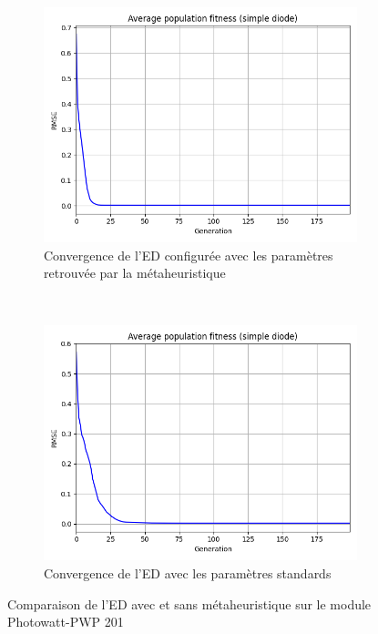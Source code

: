 \begin{figure}[!h]
    \centering
    \begin{subfigure}[b]{0.49\textwidth}
        \includegraphics[width=\textwidth]{resources/pwp/metafit.png}
        \caption{Convergence de l'ED configurée avec les paramètres retrouvée par la métaheuristique}
    \end{subfigure}
    ~
    \begin{subfigure}[b]{0.49\textwidth}
        \includegraphics[width=\textwidth]{resources/pwp/fitness.png}
        \caption{Convergence de l'ED avec les paramètres standards}
    \end{subfigure}
    \caption{Comparaison de l'ED avec et sans métaheuristique sur le module Photowatt-PWP 201}
    \label{fig:metaconv}
\end{figure}%
